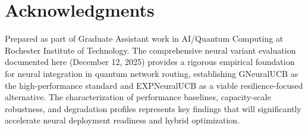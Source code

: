 \documentclass[12pt,a4paper]{article}
\begin{document}
\newpage
\section{Acknowledgments}

Prepared as part of Graduate Assistant work in AI/Quantum Computing at Rochester Institute of Technology. The comprehensive neural variant evaluation documented here (December 12, 2025) provides a rigorous empirical foundation for neural integration in quantum network routing, establishing GNeuralUCB as the high-performance standard and EXPNeuralUCB as a viable resilience-focused alternative. The characterization of performance baselines, capacity-scale robustness, and degradation profiles represents key findings that will significantly accelerate neural deployment readiness and hybrid optimization.
\end{document}
